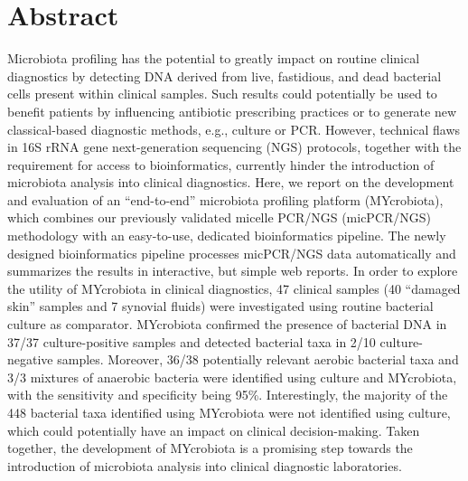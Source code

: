 \section*{Abstract}
Microbiota profiling has the potential to greatly impact on routine clinical diagnostics by detecting DNA derived from live,
fastidious, and dead bacterial cells present within clinical samples. Such results could potentially be used to benefit patients
by influencing antibiotic prescribing practices or to generate new classical-based diagnostic methods, e.g., culture or PCR.
However, technical flaws in 16S rRNA gene next-generation sequencing (NGS) protocols, together with the requirement for access
to bioinformatics, currently hinder the introduction of microbiota analysis into clinical diagnostics. Here, we report on the
development and evaluation of an “end-to-end” microbiota profiling platform (MYcrobiota), which combines our previously validated
micelle PCR/NGS (micPCR/NGS) methodology with an easy-to-use, dedicated bioinformatics pipeline. The newly designed bioinformatics
pipeline processes micPCR/NGS data automatically and summarizes the results in interactive, but simple web reports. In order to
explore the utility of MYcrobiota in clinical diagnostics, 47 clinical samples (40 “damaged skin” samples and 7 synovial fluids)
were investigated using routine bacterial culture as comparator. MYcrobiota confirmed the presence of bacterial DNA in 37/37
culture-positive samples and detected bacterial taxa in 2/10 culture-negative samples. Moreover, 36/38 potentially relevant
aerobic bacterial taxa and 3/3 mixtures of anaerobic bacteria were identified using culture and MYcrobiota, with the sensitivity
and specificity being 95\%. Interestingly, the majority of the 448 bacterial taxa identified using MYcrobiota were not identified
using culture, which could potentially have an impact on clinical decision-making. Taken together, the development of MYcrobiota
is a promising step towards the introduction of microbiota analysis into clinical diagnostic laboratories.

